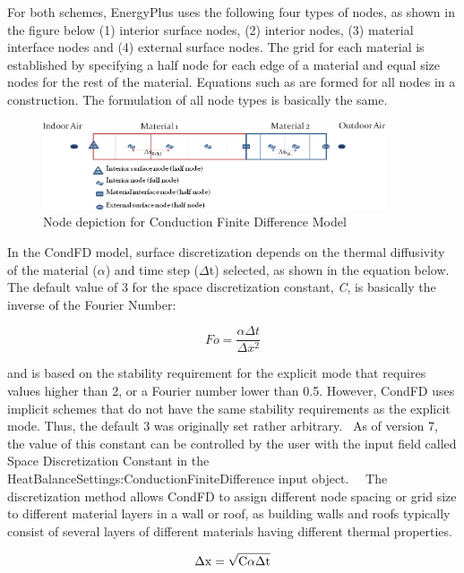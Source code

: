 For both schemes, EnergyPlus uses the following four types of nodes, as shown in the figure below (1) interior surface nodes, (2) interior nodes, (3) material interface nodes and (4) external surface nodes. The grid for each material is established by specifying a half node for each edge of a material and equal size nodes for the rest of the material. Equations such as are formed for all nodes in a construction. The formulation of all node types is basically the same.

\begin{figure}[hbtp] %
\centering
\includegraphics[width=0.9\textwidth, height=0.9\textheight, keepaspectratio=true]{media/image176.png}
\caption{Node depiction for Conduction Finite Difference Model \protect \label{fig:node-depiction-for-conduction-finite}}
\end{figure}

In the CondFD model, surface discretization depends on the thermal diffusivity of the material ($\alpha$) and time step ($\Delta$t) selected, as shown in the equation below. The default value of 3 for the space discretization constant, \emph{C}, is basically the inverse of the Fourier Number:

\begin{equation}
Fo = \frac{\alpha \Delta t}{\Delta x^2}
\end{equation}

and is based on the stability requirement for the explicit mode that requires values higher than 2, or a Fourier number lower than 0.5. However, CondFD uses implicit schemes that do not have the same stability requirements as the explicit mode. Thus, the default 3 was originally set rather arbitrary.~ As of version 7, the value of this constant can be controlled by the user with the input field called Space Discretization Constant in the HeatBalanceSettings:ConductionFiniteDifference input object.~~ The discretization method allows CondFD to assign different node spacing or grid size to different material layers in a wall or roof, as building walls and roofs typically consist of several layers of different materials having different thermal properties.

\begin{equation}
{\rm{\Delta x}} = \sqrt {{\rm{C\alpha \Delta t}}}
\end{equation}

